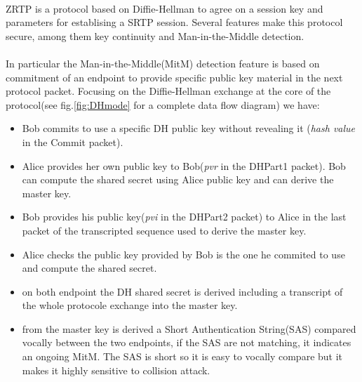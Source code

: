 \documentclass[a4paper,11pt]{article}
\begin{document}
\paragraph*{}ZRTP is a protocol based on Diffie-Hellman to agree on a session key and parameters for establising a SRTP session. Several features make this protocol secure, among them key continuity and Man-in-the-Middle detection.
\paragraph*{}In particular the Man-in-the-Middle(MitM) detection feature is based on commitment of an endpoint to provide specific public key material in the next protocol packet. Focusing on the Diffie-Hellman exchange at the core of the protocol(see fig.\ref{fig:DHmode} for a complete data flow diagram) we have:
\begin{itemize}
  \item Bob commits to use a specific DH public key without revealing it (\textit{hash value} in the Commit packet).
  \item Alice provides her own public key to Bob(\textit{pvr} in the DHPart1 packet). Bob can compute the shared secret using Alice public key and can derive the master key.
  \item Bob provides his public key(\textit{pvi} in the DHPart2 packet) to Alice in the last packet of the transcripted sequence used to derive the master key.
  \item Alice checks the public key provided by Bob is the one he commited to use and compute the shared secret.
  \item on both endpoint the DH shared secret is derived including a transcript of the whole protocole exchange into the master key.
  \item from the master key is derived a Short Authentication String(SAS) compared vocally between the two endpoints, if the SAS are not matching, it indicates an ongoing MitM. The SAS is short so it is easy to vocally compare but it makes it highly sensitive to collision attack.
\end{itemize}
\end{document}
